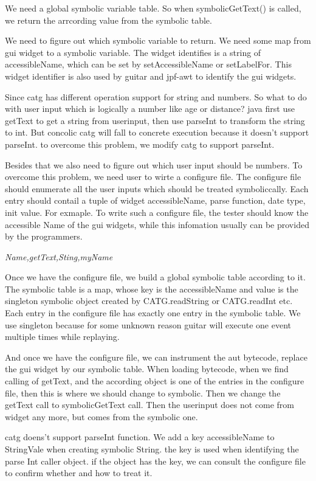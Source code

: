 \documentclass{article}
\begin{document}
We need a global symbolic variable table. So when symbolicGetText() is called, we return the arrcording value from the symbolic table.

We need to figure out which symbolic variable to return. We need some map from gui widget to a symbolic variable. The widget identifies is a string of accessibleName, which can be set by setAccessibleName or setLabelFor. This widget identifier is also used by guitar and jpf-awt to identify the gui widgets.

Since catg has different operation support for string and numbers. So what to do with user input which is logically a number like age or distance? java first use getText to get a string from userinput, then use parseInt to transform the string to int. But concolic catg will fall to concrete execution because it doesn't support parseInt. to overcome this problem, we modify catg to support parseInt.

Besides that we also need to figure out which user input should be numbers. To overcome this problem, we need user to wirte a configure file. The configure file should enumerate all the user inputs which should be treated symboliccally. Each entry should contail a tuple of widget accessibleName, parse function, date type, init value. For exmaple. To write such a configure file, the tester should know the accessible Name of the gui widgets, while this infomation usually can be provided by the programmers.

\textit{Name,getText,Sting,myName}

Once we have the configure file, we build a global symbolic table according to it. The symbolic table is a map, whose key is the accessibleName and value is the singleton symbolic object created by CATG.readString or CATG.readInt etc. Each entry in the configure file has exactly one entry in the symbolic table. We use singleton because for some unknown reason guitar will execute one event multiple times while replaying.

And once we have the configure file, we can instrument the aut bytecode, replace the gui widget by our symbolic table. When loading bytecode, when we find calling of getText, and the according object is one of the entries in the configure file, then this is where we should change to symbolic. Then we change the getText call to symbolicGetText call. Then the userinput does not come from widget any more, but comes from the symbolic one.

catg doens't support parseInt function. We add a key accessibleName  to StringVale when creating symbolic String. the key is used when identifying the parse Int caller object. if the object has the key, we can consult the configure file to confirm whether and how to treat it.
\end{document}
